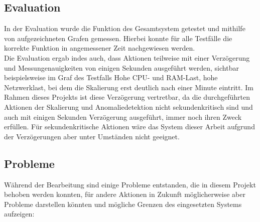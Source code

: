 \documentclass[a4paper,10pt]{scrartcl}
\begin{document}
\subsection{Evaluation}

In der Evaluation wurde die Funktion des Gesamtsystem getestet und mithilfe von aufgezeichneten Grafen gemessen. Hierbei konnte für alle Testfälle die korrekte Funktion in angemessener Zeit nachgewiesen werden.\\
Die Evaluation ergab indes auch, dass Aktionen teilweise mit einer Verzögerung und Messungenauigkeiten von einigen Sekunden ausgeführt werden, sichtbar beispielsweise im Graf des Testfalls \glqq Hohe CPU- und RAM-Last, hohe Netzwerklast\grqq , bei dem die Skalierung erst deutlich nach einer Minute eintritt. Im Rahmen dieses Projekts ist diese Verzögerung vertretbar, da die durchgeführten Aktionen der Skalierung und Anomaliedetektion nicht sekundenkritisch sind und auch mit einigen Sekunden Verzögerung ausgeführt, immer noch ihren Zweck erfüllen. Für sekundenkritische Aktionen wäre das System dieser Arbeit aufgrund der Verzögerungen aber unter Umständen nicht geeignet.\\

\subsection{Probleme}

Während der Bearbeitung sind einige Probleme entstanden, die in diesem Projekt behoben werden konnten, für andere Aktionen in Zukunft möglicherweise aber Probleme darstellen könnten und mögliche Grenzen des eingesetzten Systems aufzeigen:\\
\end{document}
